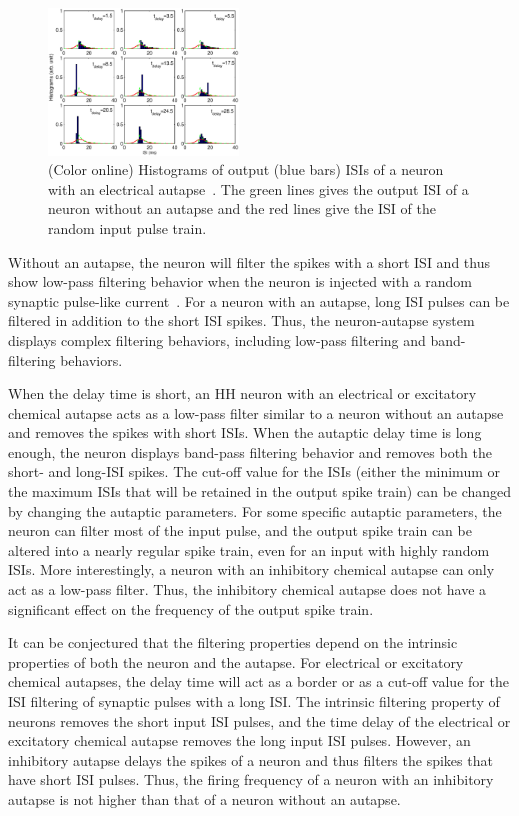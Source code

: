 \documentclass[twocolumn,showpacs,preprintnumbers,amsmath,amssymb,pre,superscriptaddress]{revtex4-1}
\begin{document}
\begin{CJK}{UTF8}{gbsn}
\begin{figure}
\begin{center}
\includegraphics[width=0.45\textwidth]{fig10.eps}
\caption{(Color online) Histograms of output (blue bars) ISIs of a neuron with an electrical autapse~\cite{wht_chaos}. The green lines gives the output ISI of a neuron without an autapse and the red lines give the ISI of the random input pulse train.} 
\label{returnmap}
\end{center}
\end{figure}


Without an autapse, the neuron will filter the spikes with a short ISI and thus show low-pass filtering behavior when the neuron is injected with a random synaptic pulse-like current~\cite{Hideo}. For a neuron with an autapse, long ISI pulses can be filtered in addition to the short ISI spikes. Thus, the neuron-autapse system displays complex filtering behaviors, including low-pass filtering and band-filtering behaviors.

When the delay time is short, an HH neuron with an electrical or excitatory chemical autapse acts as a low-pass filter similar to a neuron without an autapse and removes the spikes with short ISIs. When the autaptic delay time is long enough, the neuron displays band-pass filtering behavior and removes both the short- and long-ISI spikes. The cut-off value for the ISIs (either the minimum or the maximum ISIs that will be retained in the output spike train) can be changed by changing the autaptic parameters. For some specific autaptic parameters, the neuron can filter most of the input pulse, and the output spike train can be altered into a nearly regular spike train, even for an input with highly random ISIs. More interestingly, a neuron with an inhibitory chemical autapse can only act as a low-pass filter. Thus, the inhibitory chemical autapse does not have a significant effect on the frequency of the output spike train.

It can be conjectured that the filtering properties depend on the intrinsic properties of both the neuron and the autapse. For electrical or excitatory chemical autapses, the delay time will act as a border or as a cut-off value for the ISI filtering of synaptic pulses with a long ISI. The intrinsic filtering property of neurons removes the short input ISI pulses, and the time delay of the electrical or excitatory chemical autapse removes the long input ISI pulses. However, an inhibitory autapse delays the spikes of a neuron and thus filters the spikes that have short ISI pulses. Thus, the firing frequency of a neuron with an inhibitory autapse is not higher than that of a neuron without an autapse. 







\end{CJK}
\end{document}
